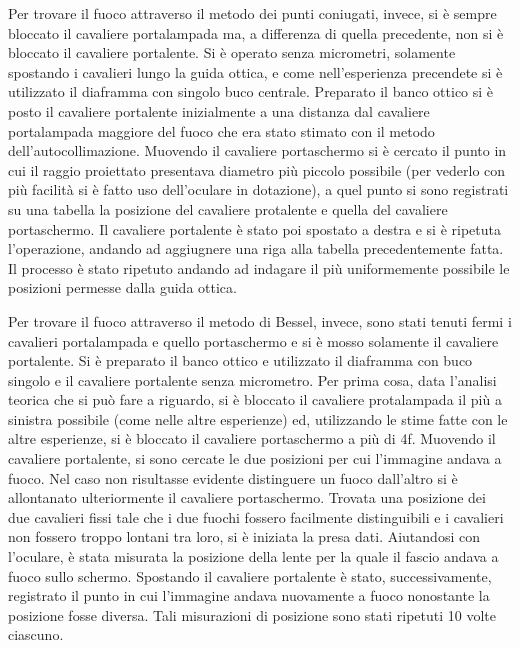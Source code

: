  Per trovare il fuoco attraverso il metodo dei punti coniugati, invece, si è sempre bloccato il cavaliere portalampada ma, a
 differenza di quella precedente, non si è bloccato il cavaliere portalente. Si è operato senza micrometri, solamente spostando i
 cavalieri lungo la guida ottica, e come nell'esperienza precendete si è utilizzato il diaframma con singolo buco centrale.
 Preparato il banco ottico si è posto il cavaliere portalente inizialmente a una distanza dal cavaliere portalampada maggiore del
 fuoco che era stato stimato con il metodo dell'autocollimazione. Muovendo il cavaliere portaschermo si è cercato il punto in cui il
 raggio proiettato presentava diametro più piccolo possibile (per vederlo con più facilità si è fatto uso dell'oculare in dotazione),
 a quel punto si sono registrati su una tabella la posizione del cavaliere protalente e quella del cavaliere portaschermo. Il
 cavaliere portalente è stato poi spostato a destra e si è ripetuta l'operazione, andando ad aggiugnere una riga alla tabella
 precedentemente fatta. Il processo è stato ripetuto andando ad indagare il più uniformemente possibile le posizioni permesse dalla
 guida ottica.

 Per trovare il fuoco attraverso il metodo di Bessel, invece, sono stati tenuti fermi i cavalieri portalampada e quello portaschermo
 e si è mosso solamente il cavaliere portalente. Si è preparato il banco ottico e utilizzato il diaframma con buco singolo e il
 cavaliere portalente senza micrometro. Per prima cosa, data l'analisi teorica che si può fare a riguardo, si è bloccato
 il cavaliere protalampada il più a sinistra possibile (come nelle altre esperienze) ed, utilizzando le stime fatte con le altre
 esperienze, si è bloccato il cavaliere portaschermo a più di 4f. Muovendo il cavaliere portalente, si sono
 cercate le due posizioni per cui l'immagine andava a fuoco. Nel caso non risultasse evidente distinguere un fuoco dall'altro si è
 allontanato ulteriormente il cavaliere portaschermo. Trovata una posizione dei due cavalieri fissi tale che i due fuochi fossero
 facilmente
 distinguibili e i cavalieri non fossero troppo lontani tra loro, si è iniziata la presa dati. Aiutandosi con l'oculare, è stata
 misurata la posizione della lente per la quale il fascio andava a fuoco sullo schermo. Spostando il cavaliere portalente è stato,
 successivamente, registrato il punto in cui l'immagine andava nuovamente a fuoco nonostante la posizione fosse diversa.
 Tali misurazioni di posizione sono stati ripetuti 10 volte ciascuno.

